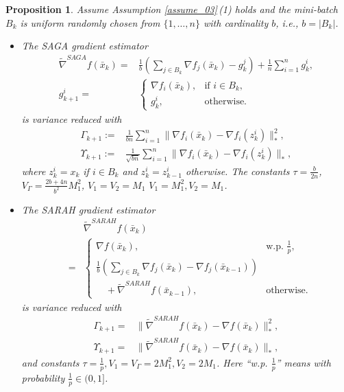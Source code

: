 \documentclass[letterpaper]{article} %
\newtheorem{proposition}{Proposition}
\begin{document}
	\begin{proposition}\label{vr_gra}
		Assume Assumption \ref{assume_03}\,(1)  holds and the mini-batch $B_{k}$ is uniform randomly chosen from   $\{ 1, \dots , n \}$ with cardinality $b$, i.e., $b=|B_{k}|$. 
		\begin{itemize}
			\item The SAGA gradient estimator  \cite{DefazioBL14} 
			\begin{align*}
				\tilde{\nabla}^{SAGA}f(\bar{x}_{k})=&\frac{1}{b}(\sum_{j\in B_{k}}\nabla f_{j}(\bar{x}_{k})-g_{k}^{j})+\frac{1}{n}\sum_{i=1}^{n}g_{k}^{i},\\
				g_{k+1}^{i}=&
				\begin{cases}
					\nabla f_{i}(\bar{x}_{k}), &\text{if }  i\in B_{k}, \\
					g_{k}^{i},&\text{otherwise.}
				\end{cases}	
			\end{align*}%
			is variance reduced with
			\begin{align*}
				\Gamma_{k+1}:=&\frac{1}{bn}\sum_{i=1}^{n}\|\nabla f_{i}(\bar{x}_{k})-\nabla f_{i}(z_{k}^{i})\|_{*}^{2},\\
				\Upsilon_{k+1}:=&\frac{1}{\sqrt{bn}}\sum_{i=1}^{n}\|\nabla f_{i}(\bar{x}_{k})-\nabla f_{i}(z_{k}^{i})\|_{*},
			\end{align*}
			where $z_{k}^{i}=x_{k}$ if $i\in B_{k}$ and $z_{k}^{i}=z_{k-1}^{i}$ otherwise. The constants $\tau=\frac{b}{2n}$, $V_{\Gamma}=\frac{2b+4n}{b^{2}}M_{1}^{2}$, $V_{1}=V_{2}=M_{1}$ $V_{1}=M_{1}^2, V_{2}=M_{1}$.
			\item The SARAH gradient estimator \cite{NguyenLST17}  
			\begin{eqnarray*}
				&&\tilde{\nabla}^{SARAH}f(\bar{x}_{k})\\
				&=&
				\left\{\begin{array}{ll}
					\nabla f(\bar{x}_{k}),\,\,&  \mbox{w.p.}\,\,\frac{1}{p},\\
					\frac{1}{b}(\underset{j\in B_{k}}{\sum}\nabla f_{j}(\bar{x}_{k})-\nabla f_{j}(\bar{x}_{k-1}))\\
					\quad+\tilde{\nabla}^{SARAH}f(\bar{x}_{k-1}),&\mbox{otherwise.}
				\end{array}\right.
			\end{eqnarray*}
			is variance reduced with
			\begin{align*}
				\Gamma_{k+1}=&\|\tilde{\nabla}^{SARAH}f(\bar{x}_{k})-\nabla f(\bar{x}_{k})\|_{*}^{2},\\
				\Upsilon_{k+1}=&\|\tilde{\nabla}^{SARAH}f(\bar{x}_{k})-\nabla f(\bar{x}_{k})\|_{*},
			\end{align*}
			and constants $\tau=\frac{1}{p}, V_{1}=V_{\Gamma}=2M_{1}^{2}, V_{2}=2M_{1}$. Here ``w.p. $\frac{1}{p}$'' means with probability $\frac{1}{p} \in (0, 1]$.  
		\end{itemize}
	\end{proposition}
\end{document}
